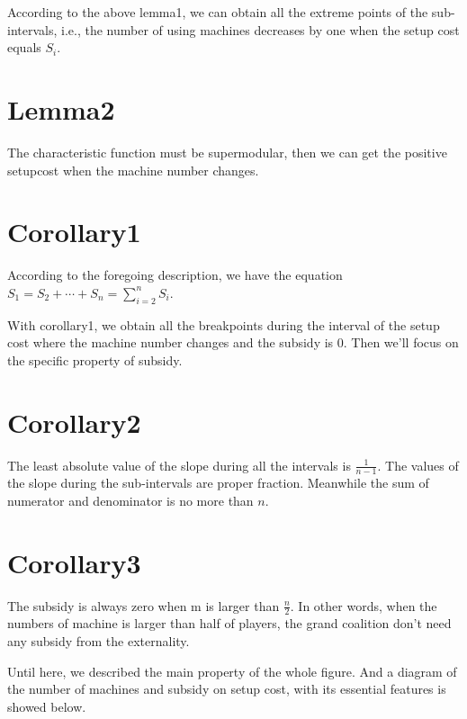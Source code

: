 \documentclass[UTF8]{article}
\begin{document}
According to the above lemma1, we can obtain all the extreme points of the sub-intervals, i.e., the number of using machines decreases by one when the setup cost equals $S_i$.

\section{Lemma2}
The characteristic function must be supermodular, then we can get the positive setupcost when the machine number changes.



\section{Corollary1}
According to the foregoing description, we have the equation $S_{1}=S_{2}+\cdots+S_{n}=\sum_{i=2}^n S_i$.

With corollary1, we obtain all the breakpoints during the interval of the setup cost where the machine number changes and the subsidy is $0$. Then we'll focus on the specific property of subsidy.

\section{Corollary2}
The least absolute value of the slope during all the intervals is $\frac{1}{n-1}$.
The values of the slope during the sub-intervals are proper fraction. Meanwhile the sum of numerator and denominator is no more than $n$.

\section{Corollary3}
The subsidy is always zero when m is larger than $\frac{n}{2}$. In other words, when the numbers of machine is larger than half of players, the grand coalition don't need any subsidy from the externality.

Until here, we described the main property of the whole figure.
And a diagram of the number of machines and subsidy on setup cost, with its essential features is showed below.
\end{document}
